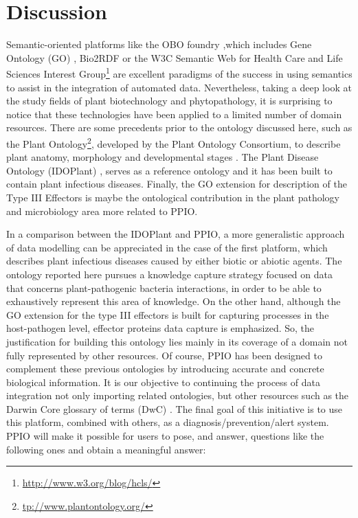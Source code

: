 \documentclass[sw]{iosart2c}
\newcommand{\myurl}[1]{\footnote{\url{#1}}}
\begin{document}
\section{Discussion}\label{sec:discussion}

Semantic-oriented platforms like the OBO foundry \cite{Smith},which includes Gene Ontology (GO) \cite{Gene}, Bio2RDF \cite{RDF} or the W3C Semantic Web for Health Care and Life Sciences Interest Group\myurl{http://www.w3.org/blog/hcls/} are excellent paradigms of the success in using semantics to assist in the integration of automated data. Nevertheless, taking a deep look at the study fields of plant biotechnology and phytopathology, it is surprising to notice that these technologies have been applied to a limited number of domain resources. There are some precedents prior to the ontology discussed here, such as the Plant Ontology\myurl{tp://www.plantontology.org/}, developed by the Plant Ontology Consortium, to describe plant anatomy, morphology and developmental stages \cite{PO}. The Plant Disease Ontology (IDOPlant) \cite{Walls} \cite{IDO}, serves as a reference ontology and it has been built to contain plant infectious diseases. Finally, the GO extension for description of the Type III Effectors \cite{Lindeberg} is maybe the ontological contribution in the plant pathology and microbiology area more related to PPIO.

In a comparison between the IDOPlant and PPIO, a more generalistic approach of data modelling can be appreciated in the case of the first platform, which describes plant infectious diseases caused by either biotic or abiotic agents. The ontology reported here pursues a knowledge capture strategy focused on data that concerns plant-pathogenic bacteria interactions, in order to be able to exhaustively represent this area of knowledge. On the other hand, although the GO extension for the type III effectors is built for capturing processes in the host-pathogen level, effector proteins data capture is emphasized. So, the justification for building this ontology lies mainly in its coverage of a domain not fully represented by other resources. Of course, PPIO has been designed to complement these previous ontologies by introducing accurate and concrete biological information. It is our objective to continuing the process of data integration not only importing related ontologies, but other resources such as the Darwin Core glossary of terms (DwC) \cite{Wieczorek2013}. The final goal of this initiative is to use this platform, combined with others, as a diagnosis/prevention/alert system. PPIO will make it possible for users to pose, and answer, questions like the following ones and obtain a meaningful answer:
\end{document}
